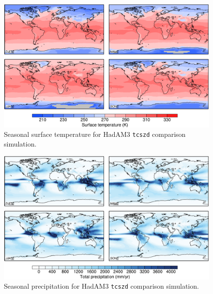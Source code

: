 \documentclass[a4paper,11pt]{article}
\begin{document}
\begin{figure}
  \begin{center}
    \includegraphics[width=\textwidth]{../hadam3-comparison/plots/ts-plots}
  \end{center}
  \caption{Seasonal surface temperature for HadAM3 \texttt{tcszd}
    comparison simulation.}
  \label{fig:ts-hadam3}
\end{figure}

\begin{figure}
  \begin{center}
    \includegraphics[width=\textwidth]{../hadam3-comparison/plots/pp-plots}
  \end{center}
  \caption{Seasonal precipitation for HadAM3 \texttt{tcszd} comparison
    simulation.}
  \label{fig:pp-hadam3}
\end{figure}
\end{document}
